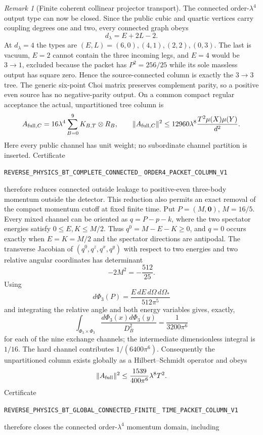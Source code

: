 \documentclass[11pt]{article}
\theoremstyle{definition}
\theoremstyle{remark}
\newtheorem{remark}[theorem]{Remark}
\begin{document}
\begin{remark}[Finite coherent collinear projector transport]
The connected order-$\lambda^4$ output type can now be closed.  Since the
public cubic and quartic vertices carry coupling degrees one and two, every
connected graph obeys
\[
 d_\lambda=E+2L-2.
\]
At $d_\lambda=4$ the types are $(E,L)=(6,0),(4,1),(2,2),(0,3)$.
The last is vacuum, $E=2$ cannot contain the three incoming legs, and $E=4$
would be $3\to1$, excluded because the packet has $P^2=256/25$ while its sole
massless output has square zero.  Hence the source-connected column is exactly
the $3\to3$ tree.  The generic six-point Choi matrix preserves complement
parity, so a positive even source has no negative-parity output.  On a common
compact regular acceptance the actual, unpartitioned tree column is
\[
 A_{{\rm full},C}=16\lambda^4
 \sum_{B=0}^{9}K_{B,T}\otimes R_B,
 \qquad
 \|A_{{\rm full},C}\|^2\le
 12960\lambda^8\frac{T^2\mu(X)\mu(Y)}{d^2}.
\]
Here every public channel has unit weight; no subordinate channel partition
is inserted.  Certificate
\par\noindent
\texttt{REVERSE\_PHYSICS\_BT\_COMPLETE\_CONNECTED\_}
\allowbreak\texttt{ORDER4\_PACKET\_COLUMN\_V1}
\par\noindent
therefore reduces connected outside leakage to positive-even three-body
momentum outside the detector.  This reduction also permits an exact removal
of the compact momentum cutoff at fixed finite time.  Put
$P=(M,\mathbf0)$, $M=16/5$.  Every mixed channel can be oriented as
$q=P-p-k$, where the two spectator energies satisfy $0\leq E,K\leq M/2$.
Thus $q^0=M-E-K\geq0$, and $q=0$ occurs exactly when
$E=K=M/2$ and the spectator directions are antipodal.  The transverse
Jacobian of $(q^0,q^z,q^x,q^y)$ with respect to two energies and two relative
angular coordinates has determinant
\[
 -2M^2=-\frac{512}{25}.
\]
Using
\[
 d\Phi_3(P)=\frac{E\,dE\,d\Omega\,d\Omega_*}{512\pi^5}
\]
and integrating the relative angle and both energy variables gives, exactly,
\[
 \int_{\Phi_3\times\Phi_3}\frac{d\Phi_3(x)d\Phi_3(y)}{D_B^2}
 =\frac{1}{3200\pi^6}
\]
for each of the nine exchange channels; the intermediate dimensionless
integral is $1/16$.  The hard channel contributes $1/(6400\pi^6)$.
Consequently the unpartitioned column exists globally as a Hilbert--Schmidt
operator and obeys
\[
 \|A_{\rm full}\|^2\leq
 \frac{1539}{400\pi^6}\lambda^8T^2.
\]
Certificate
\par\noindent
\texttt{REVERSE\_PHYSICS\_BT\_GLOBAL\_CONNECTED\_FINITE\_}
\allowbreak\texttt{TIME\_PACKET\_COLUMN\_V1}
\par\noindent
therefore closes the connected order-$\lambda^4$ momentum domain, including

\end{remark}
\end{document}
